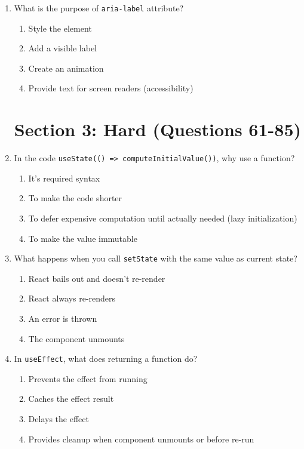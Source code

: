 \documentclass[12pt,a4paper]{article}
\begin{document}
\begin{enumerate}
\item What is the purpose of \texttt{aria-label} attribute?
\begin{enumerate}[label=\Alph*)]
    \item Style the element
    \item Add a visible label
    \item Create an animation
    \item Provide text for screen readers (accessibility)
\end{enumerate}

\newpage
\section*{\textcolor{hard}{Section 3: Hard (Questions 61-85)}}

\item In the code \texttt{useState(() => computeInitialValue())}, why use a function?
\begin{enumerate}[label=\Alph*)]
    \item It's required syntax
    \item To make the code shorter
    \item To defer expensive computation until actually needed (lazy initialization)
    \item To make the value immutable
\end{enumerate}

\item What happens when you call \texttt{setState} with the same value as current state?
\begin{enumerate}[label=\Alph*)]
    \item React bails out and doesn't re-render
    \item React always re-renders
    \item An error is thrown
    \item The component unmounts
\end{enumerate}

\item In \texttt{useEffect}, what does returning a function do?
\begin{enumerate}[label=\Alph*)]
    \item Prevents the effect from running
    \item Caches the effect result
    \item Delays the effect
    \item Provides cleanup when component unmounts or before re-run
\end{enumerate}


\end{enumerate}
\end{document}
